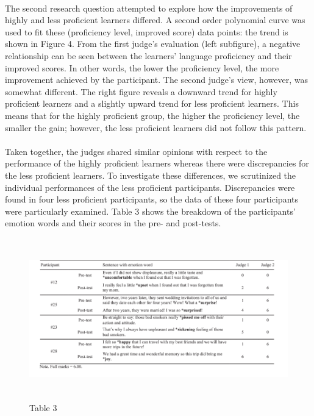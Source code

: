 \documentclass[a4paper,12pt,oneside]{article}
\begin{document}
\paragraph{}
The second research question attempted to explore how the improvements of highly and less proficient learners differed. A second order polynomial curve was used to fit these (proficiency level, improved score) data points: the trend is shown in Figure 4. From the first judge’s evaluation (left subfigure), a negative relationship can be seen between the learners’ language proficiency and their improved scores. In other words, the lower the proficiency level, the more improvement achieved by the participant. The second judge’s view, however, was somewhat different. The right figure reveals a downward trend for highly proficient learners and a slightly upward trend for less proficient learners. This means that for the highly proficient group, the higher the proficiency level, the smaller the gain; however, the less proficient learners did not follow this pattern. 
\paragraph{}
Taken together, the judges shared similar opinions with respect to the performance of the highly proficient learners whereas there were discrepancies for the less proficient learners. To investigate these differences, we scrutinized the individual performances of the less proficient participants. Discrepancies were found in four less proficient participants, so the data of these four participants were particularly examined. Table 3 shows the breakdown of the participants’ emotion words and their scores in the pre- and post-tests. 

\begin{figure}[H]
\includegraphics[height=7cm,width=16cm]{Table3.png}
\centering
\caption{Table 3}
\end{figure}
\end{document}
